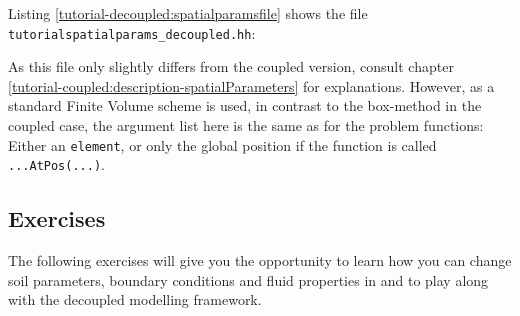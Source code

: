 Listing \ref{tutorial-decoupled:spatialparamsfile} shows the file
\verb+tutorialspatialparams_decoupled.hh+:

\begin{lst}\label{tutorial-decoupled:spatialparamsfile} \mbox{}

\end{lst}
As this file only slightly differs from the coupled version, consult 
chapter \ref{tutorial-coupled:description-spatialParameters} for explanations.
However, as a standard Finite Volume scheme is used, in contrast to the box-method
in the coupled case, the argument list here is the same as for the problem 
functions: Either an \texttt{element}, or only the global position if the function is called \texttt{...AtPos(...)}.

\subsection{Exercises}
\label{tutorial-deoucpled:exercises}
The following exercises will give you the opportunity to learn how you can change 
soil parameters, boundary conditions and fluid properties in \Dumux and to play along 
with the decoupled modelling framework.

